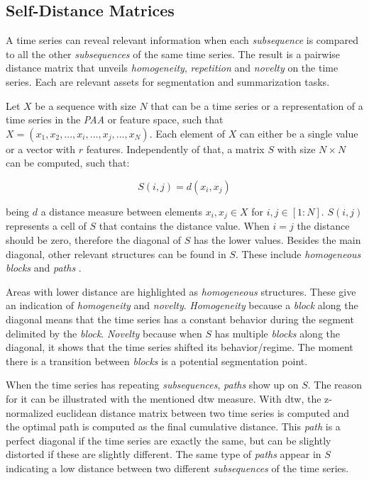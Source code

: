 \subsection{Self-Distance Matrices}
\label{subsec:dist_matrix}

A time series can reveal relevant information when each \textit{subsequence} is compared to all the other \textit{subsequences} of the same time series. The result is a pairwise distance matrix that unveils \textit{homogeneity}, \textit{repetition} and \textit{novelty} on the time series. Each are relevant assets for segmentation and summarization tasks.
\par
Let $X$ be a sequence with size $N$ that can be a time series or a representation of a time series in the \textit{PAA} or feature space, such that $X = (x_1, x_2, ..., x_i, ..., x_j, ..., x_N)$. Each element of $X$ can either be a single value or a vector with $r$ features. Independently of that, a matrix $S$ with size $N \times N$ can be computed, such that:

\begin{equation}
S(i,j)= d(x_i, x_j) 
\end{equation}

being $d$ a distance measure between elements $x_i,x_j \in X$ for $i,j \in [1:N]$. $S(i,j)$ represents a cell of $S$ that contains the distance value. When $i=j$ the distance should be zero, therefore the diagonal of $S$ has the lower values. Besides the main diagonal, other relevant structures can be found in $S$. These include \textit{homogeneous blocks} and \textit{paths} \cite{fmp, muller}. 
\par
Areas with lower distance are highlighted as \textit{homogeneous} structures. These give an indication of \textit{homogeneity} and \textit{novelty}. \textit{Homogeneity} because a \textit{block} along the diagonal means that the time series has a constant behavior during the segment delimited by the \textit{block}. \textit{Novelty} because when $S$ has multiple \textit{blocks} along the diagonal, it shows that the time series shifted its behavior/regime. The moment there is a transition between \textit{blocks} is a potential segmentation point.
\par
When the time series has repeating \textit{subsequences}, \textit{paths} show up on $S$. The reason for it can be illustrated with the mentioned \gls{dtw} measure. With \gls{dtw}, the z-normalized euclidean distance matrix between two time series is computed and the optimal path is computed as the final cumulative distance. This \textit{path} is a perfect diagonal if the time series are exactly the same, but can be slightly distorted if these are slightly different. The same type of \textit{paths} appear in $S$ indicating a low distance between two different \textit{subsequences} of the time series.

